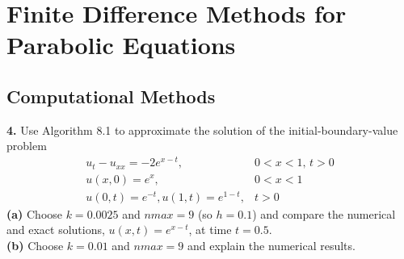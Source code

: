 \documentclass{amsbook}%
\theoremstyle{plain}
\numberwithin{equation}{section}
\begin{document}
\chapter{Finite Difference Methods for Parabolic Equations}

	\section{Computational Methods}
	
		\noindent\textbf{4.} Use Algorithm 8.1 to approximate the solution of the initial-boundary-value problem
		\begin{align}
			u_t-u_{xx}=-2e^{x-t}, & 0<x<1,\, t>0\\
			u(x,0)=e^x, & 0<x<1\\
			u(0,t)=e^{-t}, u(1,t)=e^{1-t}, & t>0
		\end{align}
		\textbf{(a)} Choose $k=0.0025$ and $nmax=9$ (so $h=0.1$) and compare the numerical and exact solutions, $u(x,t)=e^{x-t}$, at time $t=0.5$.\\
		\textbf{(b)} Choose $k=0.01$ and $nmax=9$ and explain the numerical results.
		\\[12pt]
\end{document}
